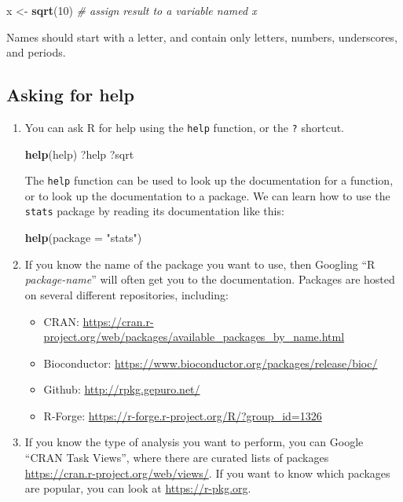 \documentclass[]{book}
\newenvironment{Shaded}{\begin{snugshade}}{\end{snugshade}}
\newcommand{\KeywordTok}[1]{\textcolor[rgb]{0.13,0.29,0.53}{\textbf{#1}}}
\newcommand{\DataTypeTok}[1]{\textcolor[rgb]{0.13,0.29,0.53}{#1}}
\newcommand{\DecValTok}[1]{\textcolor[rgb]{0.00,0.00,0.81}{#1}}
\newcommand{\StringTok}[1]{\textcolor[rgb]{0.31,0.60,0.02}{#1}}
\newcommand{\CommentTok}[1]{\textcolor[rgb]{0.56,0.35,0.01}{\textit{#1}}}
\newcommand{\NormalTok}[1]{#1}
\providecommand{\tightlist}{%
  \setlength{\itemsep}{0pt}\setlength{\parskip}{0pt}}
\begin{document}
\begin{Shaded}
\begin{Highlighting}[]
\NormalTok{x <-}\StringTok{ }\KeywordTok{sqrt}\NormalTok{(}\DecValTok{10}\NormalTok{) }\CommentTok{# assign result to a variable named x}
\end{Highlighting}
\end{Shaded}

Names should start with a letter, and contain only letters, numbers,
underscores, and periods.

\subsection{Asking for help}\label{asking-for-help}

\begin{enumerate}
\def\labelenumi{\arabic{enumi}.}
\item
  You can ask R for help using the \texttt{help} function, or the
  \texttt{?} shortcut.

\begin{Shaded}
\begin{Highlighting}[]
\KeywordTok{help}\NormalTok{(help)}
\NormalTok{?help}
\NormalTok{?sqrt}
\end{Highlighting}
\end{Shaded}

  The \texttt{help} function can be used to look up the documentation
  for a function, or to look up the documentation to a package. We can
  learn how to use the \texttt{stats} package by reading its
  documentation like this:

\begin{Shaded}
\begin{Highlighting}[]
\KeywordTok{help}\NormalTok{(}\DataTypeTok{package =} \StringTok{"stats"}\NormalTok{)}
\end{Highlighting}
\end{Shaded}
\item
  If you know the name of the package you want to use, then Googling ``R
  \emph{package-name}'' will often get you to the documentation.
  Packages are hosted on several different repositories, including:

  \begin{itemize}
  \tightlist
  \item
    CRAN:
    \url{https://cran.r-project.org/web/packages/available_packages_by_name.html}
  \item
    Bioconductor:
    \url{https://www.bioconductor.org/packages/release/bioc/}
  \item
    Github: \url{http://rpkg.gepuro.net/}
  \item
    R-Forge: \url{https://r-forge.r-project.org/R/?group_id=1326}
  \end{itemize}
\item
  If you know the type of analysis you want to perform, you can Google
  ``CRAN Task Views'', where there are curated lists of packages
  \url{https://cran.r-project.org/web/views/}. If you want to know which
  packages are popular, you can look at \url{https://r-pkg.org}.
\end{enumerate}
\end{document}
